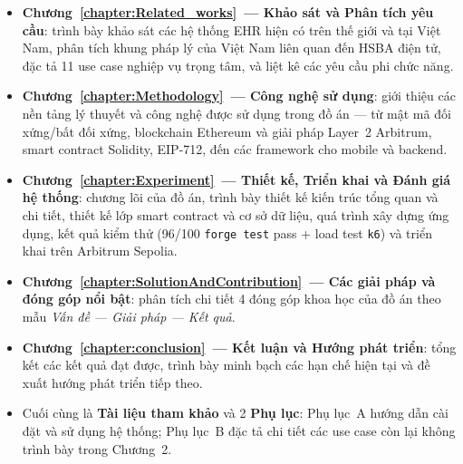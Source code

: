\documentclass[../DoAn]{subfiles}
\begin{document}
\begin{itemize}
    \item \textbf{Chương~\ref{chapter:Related_works}~--- Khảo sát và Phân tích yêu cầu}: trình bày khảo sát các hệ thống EHR hiện có trên thế giới và tại Việt Nam, phân tích khung pháp lý của Việt Nam liên quan đến HSBA điện tử, đặc tả 11 use case nghiệp vụ trọng tâm, và liệt kê các yêu cầu phi chức năng.
    \item \textbf{Chương~\ref{chapter:Methodology}~--- Công nghệ sử dụng}: giới thiệu các nền tảng lý thuyết và công nghệ được sử dụng trong đồ án --- từ mật mã đối xứng/bất đối xứng, blockchain Ethereum và giải pháp Layer~2 Arbitrum, smart contract Solidity, EIP-712, đến các framework cho mobile và backend.
    \item \textbf{Chương~\ref{chapter:Experiment}~--- Thiết kế, Triển khai và Đánh giá hệ thống}: chương lõi của đồ án, trình bày thiết kế kiến trúc tổng quan và chi tiết, thiết kế lớp smart contract và cơ sở dữ liệu, quá trình xây dựng ứng dụng, kết quả kiểm thử (96/100 \texttt{forge test} pass + load test \texttt{k6}) và triển khai trên Arbitrum Sepolia.
    \item \textbf{Chương~\ref{chapter:SolutionAndContribution}~--- Các giải pháp và đóng góp nổi bật}: phân tích chi tiết 4 đóng góp khoa học của đồ án theo mẫu \textit{Vấn đề --- Giải pháp --- Kết quả}.
    \item \textbf{Chương~\ref{chapter:conclusion}~--- Kết luận và Hướng phát triển}: tổng kết các kết quả đạt được, trình bày minh bạch các hạn chế hiện tại và đề xuất hướng phát triển tiếp theo.
    \item Cuối cùng là \textbf{Tài liệu tham khảo} và 2 \textbf{Phụ lục}: Phụ lục~A hướng dẫn cài đặt và sử dụng hệ thống; Phụ lục~B đặc tả chi tiết các use case còn lại không trình bày trong Chương~2.
\end{itemize}
\end{document}
